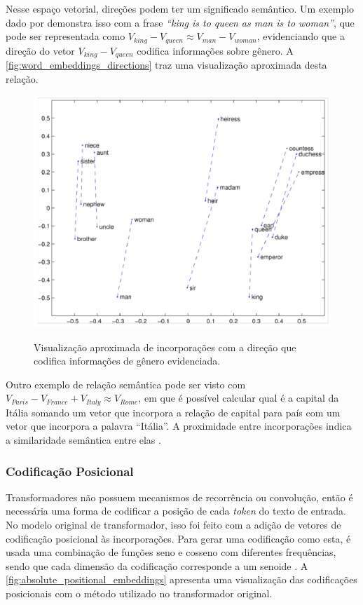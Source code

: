 Nesse espaço vetorial, direções podem ter um significado semântico. Um exemplo dado por \textcite{glove} demonstra isso com a frase \textit{``king is to queen as man is
      to woman''}, que pode ser representada como \begin{math}V_{king} - V_{queen} \approx V_{man} - V_{woman}\end{math}, evidenciando que a direção do vetor
\begin{math}V_{king} - V_{queen}\end{math} codifica informações sobre gênero. A \autoref{fig:word_embeddings_directions} traz uma visualização aproximada desta relação.

\begin{figure}[ht]
      \centering
      \caption{\small Visualização aproximada de incorporações com a direção que codifica informações de gênero evidenciada.}
      \includegraphics[width=0.6\columnwidth,keepaspectratio]{images/word_embeddings_directions.png}
      \label{fig:word_embeddings_directions}
\end{figure}

Outro exemplo de relação semântica pode ser visto com \begin{math}V_{Paris} - V_{France} + V_{Italy} \approx V_{Rome}\end{math}, em que é possível calcular qual é a
capital da Itália somando um vetor que incorpora a relação de capital para país com um vetor que incorpora a palavra ``Itália''. A proximidade entre incorporações indica
a similaridade semântica entre elas \cite{word2vec_estimation}.

\subsubsection{Codificação Posicional}

Transformadores não possuem mecanismos de recorrência ou convolução, então é necessária uma forma de codificar a posição de cada \textit{token} do texto de entrada. No
modelo original de transformador, isso foi feito com a adição de vetores de codificação posicional às incorporações. Para gerar uma codificação como esta, é usada uma
combinação de funções seno e cosseno com diferentes frequências, sendo que cada dimensão da codificação corresponde a um senoide \cite{transformer}. A
\autoref{fig:absolute_positional_embeddings} apresenta uma visualização das codificações posicionais com o método utilizado no transformador original.

